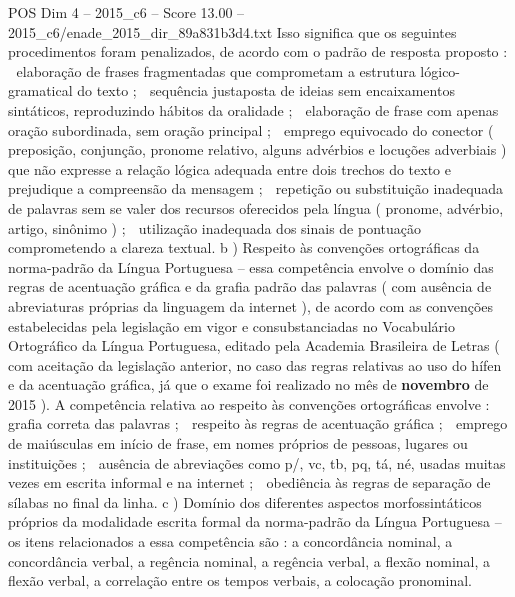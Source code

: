 \begin{textsample}{POS Dim 4 – 2015\_c6 – Score 13.00 – 2015\_c6/enade\_2015\_dir\_89a831b3d4.txt}
Isso significa que os seguintes procedimentos foram penalizados, de acordo com o padrão de resposta proposto :  elaboração de frases fragmentadas que comprometam a estrutura lógico-gramatical do texto ;  sequência justaposta de ideias sem encaixamentos sintáticos, reproduzindo hábitos da oralidade ;  elaboração de frase com apenas oração subordinada, sem oração principal ;  emprego equivocado do conector ( preposição, conjunção, pronome relativo, alguns advérbios e locuções adverbiais ) que não expresse a relação lógica adequada entre dois trechos do texto e prejudique a compreensão da mensagem ;  repetição ou substituição inadequada de palavras sem se valer dos recursos oferecidos pela língua ( pronome, advérbio, artigo, sinônimo ) ;  utilização inadequada dos sinais de pontuação comprometendo a clareza textual. b ) Respeito às convenções ortográficas da norma-padrão da Língua Portuguesa – essa competência envolve o domínio das regras de acentuação gráfica e da grafia padrão das palavras ( com ausência de abreviaturas próprias da linguagem da internet ), de acordo com as convenções estabelecidas pela legislação em vigor e consubstanciadas no Vocabulário Ortográfico da Língua Portuguesa, editado pela Academia Brasileira de Letras ( com aceitação da legislação anterior, no caso das regras relativas ao uso do hífen e da acentuação gráfica, já que o exame foi realizado no mês de \textbf{novembro} de 2015 ).
A competência relativa ao respeito às convenções ortográficas envolve :  grafia correta das palavras ;  respeito às regras de acentuação gráfica ;  emprego de maiúsculas em início de frase, em nomes próprios de pessoas, lugares ou instituições ;  ausência de abreviações como p/, vc, tb, pq, tá, né, usadas muitas vezes em escrita informal e na internet ;  obediência às regras de separação de sílabas no final da linha. c ) Domínio dos diferentes aspectos morfossintáticos próprios da modalidade escrita formal da norma-padrão da Língua Portuguesa – os itens relacionados a essa competência são : a concordância nominal, a concordância verbal, a regência nominal, a regência verbal, a flexão nominal, a flexão verbal, a correlação entre os tempos verbais, a colocação pronominal.

\end{textsample}
